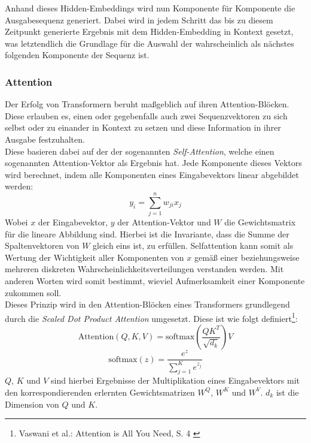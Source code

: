 Anhand dieses Hidden-Embeddings wird nun Komponente für Komponente die Ausgabesequenz generiert. Dabei wird in jedem Schritt das bis zu diesem Zeitpunkt generierte Ergebnis mit dem Hidden-Embedding in Kontext gesetzt, was letztendlich die Grundlage für die Auswahl der wahrscheinlich als nächstes folgenden Komponente der Sequenz ist.

\subsubsection{Attention}

Der Erfolg von Transformern beruht maßgeblich auf ihren Attention-Blöcken. Diese erlauben es, einen oder gegebenfalls auch zwei Sequenzvektoren zu sich selbst oder zu einander in Kontext zu setzen und diese Information in ihrer Ausgabe festzuhalten. \\
Diese basieren dabei auf der der sogenannten \textit{Self-Attention}, welche einen sogenannten Attention-Vektor als Ergebnis hat. Jede Komponente dieses Vektors wird berechnet, indem alle Komponenten eines Eingabevektors linear abgebildet werden:
\begin{equation}
    y_i = \sum_{j=1}^n w_{ji}x_j
\end{equation}
Wobei $x$ der Eingabevektor, $y$ der Attention-Vektor und $W$ die Gewichtsmatrix für die lineare Abbildung sind. Hierbei ist die Invariante, dass die Summe der Spaltenvektoren von $W$ gleich eins ist, zu erfüllen. Selfattention kann somit als Wertung der Wichtigkeit aller Komponenten von $x$ gemäß einer beziehungsweise mehreren diskreten Wahrscheinlichkeitsverteilungen verstanden werden. Mit anderen Worten wird somit bestimmt, wieviel Aufmerksamkeit einer Komponente zukommen soll. \\
Dieses Prinzip wird in den Attention-Blöcken eines Transformers grundlegend durch die \textit{Scaled Dot Product Attention} umgesetzt. Diese ist wie folgt definiert\footnote{
    Vaswani et al.: Attention is All You Need, S. 4
    \cite{vaswani2023attentionneed}
}:
\begin{equation}
    \text{Attention}(Q, K, V) = \text{softmax}
    \left (
        \frac {QK^T} {\sqrt{d_k}}
    \right ) V
\end{equation}
\begin{equation}
    \text{softmax}(z) = \frac{e^z}{\sum_{j=1}^K e^{z_j}}
\end{equation}
$Q$, $K$ und $V$ sind hierbei Ergebnisse der Multiplikation eines Eingabevektors mit den korrespondierenden erlernten Gewichtsmatrizen $W^Q$, $W^K$ und $W^V$. $d_k$ ist die Dimension von $Q$ und $K$. \\
